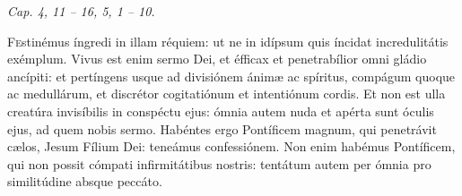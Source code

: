 
{\hfill \textit{Cap. 4, 11 – 16, 5, 1 – 10.}} 

\lettrine{F}{e}stinémus íngredi in illam réquiem: ut ne in idí\-psum quis íncidat incredulitátis exémplum.
Vivus est enim sermo Dei, et éfficax et penetrabílior o\-mni gládio ancípiti: et pertíngens usque ad divisiónem ánimæ ac spíritus, compágum quoque ac medullárum, et discrétor cogitatiónum et intentiónum cordis.
Et non est ulla creatúra invisíbilis in conspéctu ejus: ó\-mnia autem nuda et apérta sunt óculis ejus, ad quem nobis sermo.
Habéntes ergo Pontíficem magnum, qui penetrávit cælos, Jesum Fílium Dei: teneámus confessiónem.
Non enim habémus Pontíficem, qui non possit cómpati infirmitátibus nostris: tentátum autem per ómnia pro similitúdine absque peccáto.